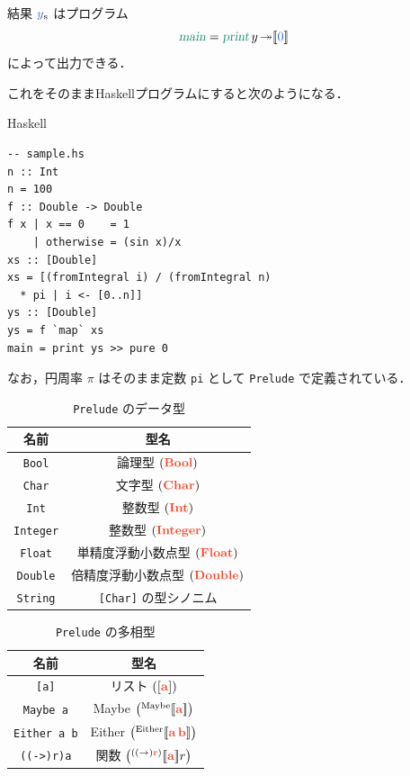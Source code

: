 \documentclass[a5paper,twoside,fleqn,draft]{jsbook}
\def\[{[\![}
\def\]{]\!]}
\def\varColor{NavyBlue}
\def\actionColor{PineGreen}
\def\typeColor{RedOrange}
\newcommand{\programminglanguage}[1]{\textsf{#1}}
\newcommand{\haskell}{\programminglanguage{Haskell}}
\newcommand{\code}[1]{\texttt{#1}}
\newcommand{\filename}[1]{\texttt{#1}}
\newenvironment{haskellcode}{\begin{itembox}[r]{\haskell}}{\end{itembox}}
\newcommand{\mVar}[1]{\textcolor{\varColor}{#1}}
\newcommand{\mActionLong}[1]{\textcolor{\actionColor}{\textsl{#1}}}
\DeclareMathOperator{\mMain}{\mActionLong{main}}
\DeclareMathOperator{\mPrint}{\mActionLong{print}}
\DeclareMathOperator{\mBindRightIgnore}{\twoheadrightarrow}
\newcommand{\mType}[1]{\textcolor{\typeColor}{\mathbf{#1}}}
\newcommand{\mA}{\mType{a}}
\newcommand{\mBoolType}{\mType{Bool}}
\newcommand{\mCharType}{\mType{Char}}
\newcommand{\mFloatType}{\mType{Float}}
\newcommand{\mDoubleType}{\mType{Double}}
\newcommand{\mIntType}{\mType{Int}}
\newcommand{\mIntegerType}{\mType{Integer}}
\newcommand{\mTypeAssemble}[2]{{}^\mathrm{#1}\[\mType{#2}\]}
\newcommand{\mTypeAssembleII}[3]{{}^\mathrm{#1}\[\mType{#2}\,\mType{#3}\]}
\newcommand{\mEitherType}[2]{\mTypeAssembleII{Either}{#1}{#2}}
\newcommand{\mMaybeType}[1]{\mTypeAssemble{Maybe}{#1}}
\DeclareMathOperator{\mFuncTypeConstructor}{((\rightarrow)\mType{r})}
\newcommand{\mFuncType}[1]{\mTypeAssemble{\mFuncTypeConstructor}{#1}}
\newcommand{\mPureWith}[1]{\[\mVar{#1}\]}
\newcommand{\mList}[1]{\mVar{#1}_\mathrm{s}}
\begin{document}
結果 $\mList{y}$ はプログラム
\begin{equation}
\mMain=\mPrint y\mBindRightIgnore\mPureWith{0}
\end{equation}
によって出力できる．

これをそのまま\haskell プログラムにすると次のようになる．
\begin{haskellcode}
\begin{verbatim}
-- sample.hs
n :: Int
n = 100
f :: Double -> Double
f x | x == 0    = 1
    | otherwise = (sin x)/x
xs :: [Double]
xs = [(fromIntegral i) / (fromIntegral n)
  * pi | i <- [0..n]]
ys :: [Double]
ys = f `map` xs
main = print ys >> pure 0
\end{verbatim}
\end{haskellcode}

なお，円周率 $\pi$ はそのまま定数 \code{pi} として \filename{Prelude}
で定義されている．

\begin{table}
\caption{\filename{Prelude} のデータ型}
\label{tab:data-types}
\begin{center}
\begin{tabular}{||c|c||}
\hline
名前&型名\\
\hline\hline
\code{Bool}&論理型 $(\mBoolType)$\\
\code{Char}&文字型 $(\mCharType)$\\
\code{Int}&整数型 $(\mIntType)$\\
\code{Integer}&整数型 $(\mIntegerType)$\\
\code{Float}&単精度浮動小数点型 $(\mFloatType)$\\
\code{Double}&倍精度浮動小数点型 $(\mDoubleType)$\\
\code{String}&\code{[Char]} の型シノニム\\
\hline
\end{tabular}
\end{center}
\end{table}

\begin{table}
\caption{\filename{Prelude} の多相型}
\label{tab:data-types-polymorphic}
\begin{center}
\begin{tabular}{||c|c||}
\hline
名前&型名\\
\hline\hline
\code{[a]}&リスト $([\mA])$\\
\code{Maybe a}&Maybe $\left(\mMaybeType{a}\right)$\\
\code{Either a b}&Either $\left(\mEitherType{a}{b}\right)$\\
\code{((->)r)a}&関数 $\left(\mFuncType{a}{r}\right)$\\
\hline
\end{tabular}
\end{center}
\end{table}
\end{document}
